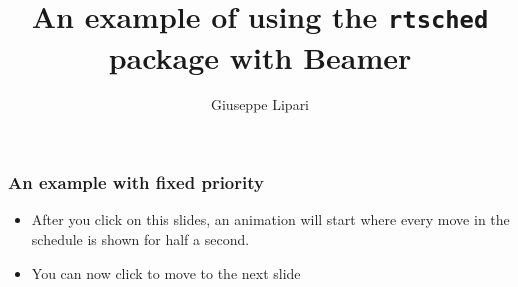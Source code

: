 \documentclass[dvips]{beamer}
\title{An example of using the \texttt{rtsched} package with Beamer}
\author{Giuseppe Lipari}
\institute[Scuola Superiore Sant'Anna]{Scuola Superiore Sant'Anna -- Pisa}
\begin{document}
\begin{frame}
  \titlepage
\end{frame}

\begin{frame}
  \frametitle{An example with fixed priority}
  \begin{itemize}
  \item After you click on this slides, an animation will start where
    every move in the schedule is shown for half a second.
  \end{itemize}
  \begin{figure}
    \centering
    \begin{RTGrid}[width=.7\textwidth]{2}{20}


      
      
    \end{RTGrid}
  \end{figure}
  \begin{itemize}
  \item<+-> You can now click to move to the next slide
  \end{itemize}
\end{frame}
\end{document}
